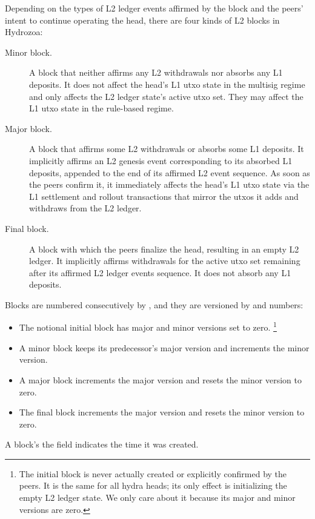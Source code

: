 \documentclass[../hydrozoa.tex]{subfiles}
\begin{document}
Depending on the types of L2 ledger events affirmed by the block and the peers' intent to continue operating the head, there are four kinds of L2 blocks in Hydrozoa:
\begin{description}
  \item[Minor block.] A block that neither affirms any L2 withdrawals nor absorbs any L1 deposits.
    It does not affect the head's L1 utxo state in the multisig regime and only affects the L2 ledger state's active utxo set.
    They may affect the L1 utxo state in the rule-based regime.
  \item[Major block.] A block that affirms some L2 withdrawals or absorbs some L1 deposits.
    It implicitly affirms an L2 genesis event corresponding to its absorbed L1 deposits, appended to the end of its affirmed L2 event sequence.
    As soon as the peers confirm it, it immediately affects the head's L1 utxo state via the L1 settlement and rollout transactions that mirror the utxos it adds and withdraws from the L2 ledger.
  \item[Final block.] A block with which the peers finalize the head, resulting in an empty L2 ledger.
    It implicitly affirms withdrawals for the active utxo set remaining after its affirmed L2 ledger events sequence.
    It does not absorb any L1 deposits.
\end{description}

Blocks are numbered consecutively by , and they are versioned by  and  numbers:
\begin{itemize}
  \item The notional initial block has major and minor versions set to zero.%
    \footnote{The initial block is never actually created or explicitly confirmed by the peers.
      It is the same for all hydra heads; its only effect is initializing the empty L2 ledger state.
      We only care about it because its major and minor versions are zero.}
  \item A minor block keeps its predecessor's major version and increments the minor version.
  \item A major block increments the major version and resets the minor version to zero.
  \item The final block increments the major version and resets the minor version to zero.
\end{itemize}

A block's the  field indicates the time it was created.
\end{document}
